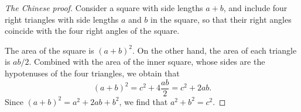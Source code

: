 \begin{proof}[The Chinese proof]
  Consider a square with side lengths $a+b$, and include four right triangles with side lengths $a$ and $b$ in the square, so that their right angles coincide with the four right angles of the square.
  \begin{figure}[H]
    \centering
  \end{figure}
  The area of the square is $(a+b)^2$. On the other hand, the area of each triangle is $ab/2$. Combined with the area of the inner square, whose sides are the hypotenuses of the four triangles, we obtain that
  \begin{equation*}
    (a+b)^2 = c^2 + 4\frac{ab}{2} = c^2 + 2ab.
  \end{equation*}
  Since $(a+b)^2=a^2+2ab+b^2$, we find that $a^2+b^2=c^2$.
\end{proof}

